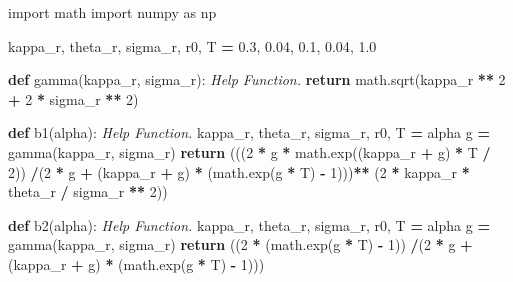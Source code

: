 \documentclass[
]{book}
\newenvironment{Shaded}{\begin{snugshade}}{\end{snugshade}}
\newcommand{\CommentTok}[1]{\textcolor[rgb]{0.56,0.35,0.01}{\textit{#1}}}
\newcommand{\ControlFlowTok}[1]{\textcolor[rgb]{0.13,0.29,0.53}{\textbf{#1}}}
\newcommand{\DecValTok}[1]{\textcolor[rgb]{0.00,0.00,0.81}{#1}}
\newcommand{\FloatTok}[1]{\textcolor[rgb]{0.00,0.00,0.81}{#1}}
\newcommand{\ImportTok}[1]{#1}
\newcommand{\KeywordTok}[1]{\textcolor[rgb]{0.13,0.29,0.53}{\textbf{#1}}}
\newcommand{\NormalTok}[1]{#1}
\newcommand{\OperatorTok}[1]{\textcolor[rgb]{0.81,0.36,0.00}{\textbf{#1}}}
\begin{document}
\begin{Shaded}
\begin{Highlighting}[]
\ImportTok{import}\NormalTok{ math}
\ImportTok{import}\NormalTok{ numpy }\ImportTok{as}\NormalTok{ np}

\NormalTok{kappa\_r, theta\_r, sigma\_r, r0, T }\OperatorTok{=} \FloatTok{0.3}\NormalTok{, }\FloatTok{0.04}\NormalTok{, }\FloatTok{0.1}\NormalTok{, }\FloatTok{0.04}\NormalTok{, }\FloatTok{1.0}

\KeywordTok{def}\NormalTok{ gamma(kappa\_r, sigma\_r):}
  \CommentTok{\textquotesingle{}\textquotesingle{}\textquotesingle{} Help Function. \textquotesingle{}\textquotesingle{}\textquotesingle{}}
  \ControlFlowTok{return}\NormalTok{ math.sqrt(kappa\_r }\OperatorTok{**} \DecValTok{2} \OperatorTok{+} \DecValTok{2} \OperatorTok{*}\NormalTok{ sigma\_r }\OperatorTok{**} \DecValTok{2}\NormalTok{)}

\KeywordTok{def}\NormalTok{ b1(alpha):}
  \CommentTok{\textquotesingle{}\textquotesingle{}\textquotesingle{} Help Function. \textquotesingle{}\textquotesingle{}\textquotesingle{}}
\NormalTok{  kappa\_r, theta\_r, sigma\_r, r0, T }\OperatorTok{=}\NormalTok{ alpha}
\NormalTok{  g }\OperatorTok{=}\NormalTok{ gamma(kappa\_r, sigma\_r)}
  \ControlFlowTok{return}\NormalTok{ (((}\DecValTok{2} \OperatorTok{*}\NormalTok{ g }\OperatorTok{*}\NormalTok{ math.exp((kappa\_r }\OperatorTok{+}\NormalTok{ g) }\OperatorTok{*}\NormalTok{ T }\OperatorTok{/} \DecValTok{2}\NormalTok{)) }\OperatorTok{/}\NormalTok{(}\DecValTok{2} \OperatorTok{*}\NormalTok{ g }\OperatorTok{+}\NormalTok{ (kappa\_r }\OperatorTok{+}\NormalTok{ g) }\OperatorTok{*}\NormalTok{ (math.exp(g }\OperatorTok{*}\NormalTok{ T) }\OperatorTok{{-}} \DecValTok{1}\NormalTok{)))}\OperatorTok{**}\NormalTok{ (}\DecValTok{2} \OperatorTok{*}\NormalTok{ kappa\_r }\OperatorTok{*}\NormalTok{ theta\_r }\OperatorTok{/}\NormalTok{ sigma\_r }\OperatorTok{**} \DecValTok{2}\NormalTok{))}


\KeywordTok{def}\NormalTok{ b2(alpha):}
  \CommentTok{\textquotesingle{}\textquotesingle{}\textquotesingle{} Help Function. \textquotesingle{}\textquotesingle{}\textquotesingle{}}
\NormalTok{  kappa\_r, theta\_r, sigma\_r, r0, T }\OperatorTok{=}\NormalTok{ alpha}
\NormalTok{  g }\OperatorTok{=}\NormalTok{ gamma(kappa\_r, sigma\_r)}
  \ControlFlowTok{return}\NormalTok{ ((}\DecValTok{2} \OperatorTok{*}\NormalTok{ (math.exp(g }\OperatorTok{*}\NormalTok{ T) }\OperatorTok{{-}} \DecValTok{1}\NormalTok{)) }\OperatorTok{/}\NormalTok{(}\DecValTok{2} \OperatorTok{*}\NormalTok{ g }\OperatorTok{+}\NormalTok{ (kappa\_r }\OperatorTok{+}\NormalTok{ g) }\OperatorTok{*}\NormalTok{ (math.exp(g }\OperatorTok{*}\NormalTok{ T) }\OperatorTok{{-}} \DecValTok{1}\NormalTok{)))}


\end{Highlighting}
\end{Shaded}
\end{document}
